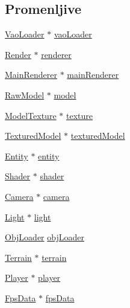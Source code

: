 \subsection*{Promenljive}
\begin{DoxyCompactItemize}
\item 
\hyperlink{classcore_1_1VaoLoader}{Vao\+Loader} $\ast$ \hyperlink{namespacecore_a78dd24784c415d3759a0f71b8f4f9f81}{vao\+Loader}
\item 
\hyperlink{classcore_1_1Render}{Render} $\ast$ \hyperlink{namespacecore_a4f2740ccbefd3bb34c624a8c99d6446d}{renderer}
\item 
\hyperlink{classcore_1_1MainRenderer}{Main\+Renderer} $\ast$ \hyperlink{namespacecore_a01adfda2bbace85dc243e5fba0d93b52}{main\+Renderer}
\item 
\hyperlink{classmodel_1_1RawModel}{Raw\+Model} $\ast$ \hyperlink{namespacecore_aa1479d4ed4dadbfe085b26662122b68a}{model}
\item 
\hyperlink{classtexture_1_1Texture}{Model\+Texture} $\ast$ \hyperlink{namespacecore_a0738503bf610d37d44b4938dc024bfcc}{texture}
\item 
\hyperlink{classmodel_1_1TexturedModel}{Textured\+Model} $\ast$ \hyperlink{namespacecore_ad4d5c25548862489d6a237342748ad74}{textured\+Model}
\item 
\hyperlink{classentity_1_1Entity}{Entity} $\ast$ \hyperlink{namespacecore_aa710c0ea388433d2d80d1d1c67582eda}{entity}
\item 
\hyperlink{classshader_1_1Shader}{Shader} $\ast$ \hyperlink{namespacecore_adf2f7f5f951bd01b06d6c792d7bf301b}{shader}
\item 
\hyperlink{classentity_1_1Camera}{Camera} $\ast$ \hyperlink{namespacecore_a9d645c490b142886301256f6cf9c65c2}{camera}
\item 
\hyperlink{classentity_1_1Light}{Light} $\ast$ \hyperlink{namespacecore_a2324d96000e7c6d42570a0577e8f070b}{light}
\item 
\hyperlink{classcore_1_1ObjLoader}{Obj\+Loader} \hyperlink{namespacecore_abf1a2ebbee224aa2f7a35148ebcac1fb}{obj\+Loader}
\item 
\hyperlink{classterrain_1_1Terrain}{Terrain} $\ast$ \hyperlink{namespacecore_ac45da6f80dac9bead5c9310c27897f15}{terrain}
\item 
\hyperlink{classentity_1_1Player}{Player} $\ast$ \hyperlink{namespacecore_a8130d7cf3bb04bc517651bc3855f8c0f}{player}
\item 
\hyperlink{classutility_1_1FpsData}{Fps\+Data} $\ast$ \hyperlink{namespacecore_a5d5106eb67b679c9260ebe0a9faf14db}{fps\+Data}

\end{DoxyCompactItemize}
